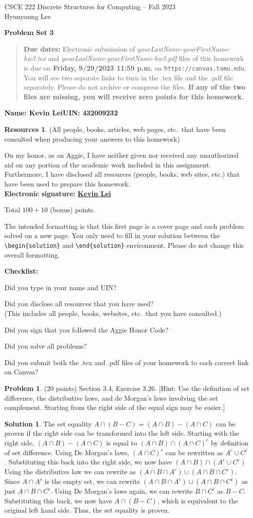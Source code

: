 \documentclass{article}
\theoremstyle{definition}
\newtheorem{problem}{Problem}
\newtheorem*{solution}{Solution}
\newtheorem*{resources}{Resources}
\newcommand{\name}[2]{\noindent\textbf{Name: #1}\hfill \textbf{UIN: #2}
  \newcommand{\myName}{#1}
  \newcommand{\myUIN}{#2}
}
\newcommand{\honor}{\noindent On my honor, as an Aggie, I have neither
  given nor received any unauthorized aid on any portion of the
  academic work included in this assignment. Furthermore, I have
  disclosed all resources (people, books, web sites, etc.) that have
  been used to prepare this homework. \\[2ex]
 \textbf{Electronic signature:} \underline{ \textbf{Kevin Lei} } } %
\newcommand{\checklist}{\noindent\textbf{Checklist:}
\begin{compactitem}[$\Box$] 
\item Did you type in your name and UIN? 
\item Did you disclose all resources that you have used? \\
(This includes all people, books, websites, etc.\ that you have consulted.)
\item Did you sign that you followed the Aggie Honor Code? 
\item Did you solve all problems? 
\item Did you submit both the .tex and .pdf files of your homework to each correct link on Canvas? 
\end{compactitem}
}
\newcommand{\problemset}[1]{\begin{center}\textbf{Problem Set #1}\end{center}}
\newcommand{\duedate}[1]{\begin{quote}\textbf{Due dates:} Electronic
    submission of \textsl{yourLastName-yourFirstName-hw3.tex} and 
    \textsl{yourLastName-yourFirstName-hw3.pdf} files of this homework is due on
    \textbf{#1} on \texttt{https://canvas.tamu.edu}. You will see two separate links
    to turn in the .tex file and the .pdf file separately. Please do not archive or compress the files.  
    \textbf{If any of the two files are missing, you will receive zero points for this homework.}\end{quote} }
\begin{document}
\begin{center}
{\large
CSCE 222 Discrete Structures for Computing -- Fall 2023\\[.5ex]
Hyunyoung Lee\\}
\end{center}
\problemset{3}
\duedate{Friday, 9/29/2023 11:59 p.m.}
\name{Kevin Lei}{432009232}  %

\begin{resources} (All people, books, articles, web pages, etc.\ that
  have been consulted when producing your answers to this homework)
\end{resources}
\honor

\bigskip

\noindent
Total $100+10$ (bonus) points.

\bigskip

\noindent
The intended formatting is that this first page is a cover page and each 
problem solved on a new page. You only need to fill in your solution between 
the \verb|\begin{solution}| and \verb|\end{solution}| environment.  
Please do not change this overall formatting.

\vfill
\checklist

\newpage
\begin{problem} (20 points) Section 3.4, Exercise 3.26.
[Hint: Use the definition of set difference, the distributive laws, and de Morgan's
laws involving the set complement. Starting from the right side of the equal sign
may be easier.]
\end{problem}
\begin{solution} 
The set equality $A \cap (B - C) = (A \cap B) - (A \cap C)$ can be proven if the right side can be transformed into the left side.
Starting with the right side, $(A \cap B) - (A \cap C)$ is equal to $(A \cap B) \cap (A \cap C)^c$ by definition of set difference.
Using De Morgan's laws, $(A \cap C)^c$ can be rewritten as $A^c \cup C^c$.
Substituting this back into the right side, we now have $(A \cap B) \cap (A^c \cup C^c)$
Using the distributive law we can rewrite as $(A \cap B \cap A^c) \cup (A \cap B \cap C^c)$.
Since $A \cap A^c$ is the empty set, we can rewrite $(A \cap B \cap A^c) \cup (A \cap B \cap C^c)$ as just $A \cap B \cap C^c$.
Using De Morgan's laws again, we can rewrite $B \cap C^c$ as $B - C$.
Substituting this back, we now have $A \cap (B - C)$, which is equivalent to the original left hand side.
Thus, the set equality is proven.
\end{solution}
\end{document}
